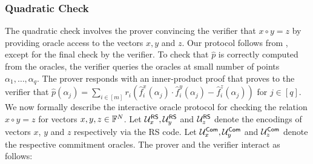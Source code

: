 \subsubsection{Quadratic Check}\label{sec:quadcheck2D}
The quadratic check involves the prover convincing the verifier that $x\circ y=z$ 
by providing oracle access to the vectors $x,y$ and $z$. Our protocol follows from
\cite{ligero}, except for the final check by the verifier.
To check that $\hat{p}$ is correctly computed from the oracles, the verifier queries 
the oracles at small number of points $\alpha_1,\ldots,\alpha_q$. The prover responds
with an inner-product proof that proves to the verifier that $\hat{p}(\alpha_j)=\sum_{i\in
[m]}r_i(\hat{f}^x_i(\alpha_j) \cdot \hat{f}^y_i(\alpha_j)-\hat{f}^z_i(\alpha_j))$ for $j\in [q]$.\\

We now formally describe the interactive oracle protocol for checking the relation
$x\circ y = z$ for vectors $x,y,z\in \mathbb{F}^N$. Let $\mathcal{U}^{\mathsf{RS}}_x,\mathcal{U}^{\mathsf{RS}}_y$ and
$\mathcal{U}^{\mathsf{RS}}_z$ denote the encodings of vectors $x$, $y$ and $z$ respectively via
the RS code. Let $\mathcal{U}^{\mathsf{Com}}_x,\mathcal{U}^{\mathsf{Com}}_y$ and $\mathcal{U}^{\mathsf{Com}}_z$ denote
the respective commitment oracles. The prover and the verifier interact as
follows:

